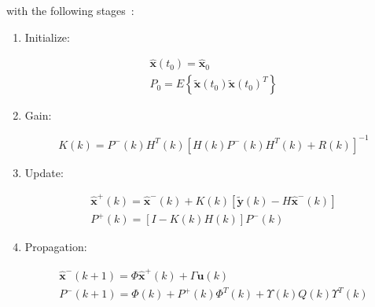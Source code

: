 with the following stages~\cite{crassidis2004dynamic}: \\

\begin{enumerate}
    \item Initialize:

\begin{subequations}
\begin{align}
    \hat{\textbf{x}}(t_{0}) = \hat{\textbf{x}}_{0} \\
    P_{0} = E \left\{ \tilde{\textbf{x}}(t_{0}) \tilde{\textbf{x}}(t_{0})^{T} \right\}
\end{align}
\end{subequations}

    \item Gain:

\begin{equation}
    K(k) = P^{-}(k) H^{T}(k) \left[ H(k) P^{-}(k) H^{T}(k) + R(k) \right]^{-1}
\end{equation}

    \item Update:

\begin{subequations}
\begin{align}
    \hat{\textbf{x}}^{+}(k) = \hat{\textbf{x}}^{-}(k) + K(k) \left[ \tilde{\textbf{y}}(k) - H \hat{\textbf{x}}^{-}(k) \right] \\
    P^{+}(k) = \left[ I - K(k) H(k) \right] P^{-}(k)
\end{align}
\end{subequations}

    \item Propagation:

\begin{subequations}
\begin{align}
    \hat{\textbf{x}}^{-}(k + 1) = \Phi \hat{\textbf{x}}^{+}(k) + \Gamma \textbf{u}(k) \\
    P^{-}(k + 1) = \Phi(k) + P^{+}(k) \Phi^{T}(k) + \Upsilon(k) Q(k) \Upsilon^{T}(k)
\end{align}
\end{subequations}
\end{enumerate}

